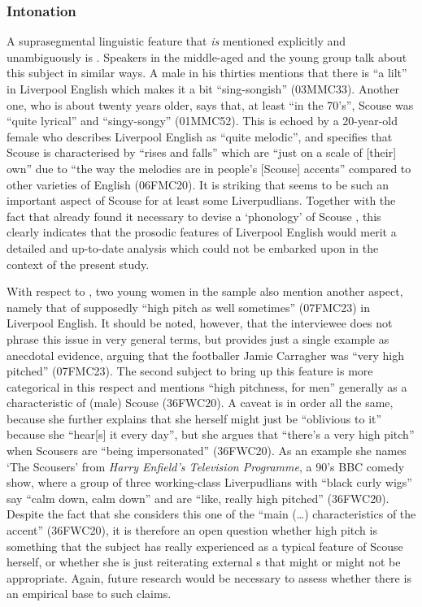 \subsubsection{Intonation}

A suprasegmental linguistic feature that \emph{is} mentioned explicitly and unambiguously is .
Speakers in the middle-aged and the young group talk about this subject in similar ways.
A male in his thirties mentions that there is ``a lilt'' in Liverpool English which makes it a bit ``sing-songish'' (03MMC33).
Another one, who is about twenty years older, says that, at least ``in the 70's'', Scouse was ``quite lyrical'' and ``singy-songy'' (01MMC52).
This is echoed by a 20-year-old female who describes Liverpool English as ``quite melodic'', and specifies that Scouse  is characterised by ``rises and falls'' which are ``just on a scale of [their] own'' due to ``the way the melodies are in people's [Scouse] accents'' compared to other varieties of English (06FMC20).
It is striking that  seems to be such an important aspect of Scouse for at least some Liverpudlians.
Together with the fact that \textcite{knowles1973} already found it necessary to devise a `phonology' of Scouse , this clearly indicates that the prosodic features of Liverpool English would merit a detailed and up-to-date analysis which could not be embarked upon in the context of the present study.

With respect to , two young women in the sample also mention another aspect, namely that of supposedly ``high pitch as well sometimes'' (07FMC23) in Liverpool English.
It should be noted, however, that the interviewee does not phrase this issue in very general terms, but provides just a single example as anecdotal evidence, arguing that the footballer Jamie Carragher was ``very high pitched'' (07FMC23).
The second subject to bring up this feature is more categorical in this respect and mentions ``high pitchness, for men'' generally as a characteristic of (male) Scouse (36FWC20).
A caveat is in order all the same, because she further explains that she herself might just be ``oblivious to it'' because she ``hear[s] it every day'', but she argues that ``there's a very high pitch'' when Scousers are ``being impersonated'' (36FWC20).
As an example she names `The Scousers' from \emph{Harry Enfield's Television Programme}, a 90's BBC comedy show, where a group of three  working-class Liverpudlians with ``black curly wigs'' say ``calm down, calm down'' and are ``like, really high pitched'' (36FWC20).
Despite the fact that she considers this one of the ``main (\ldots) characteristics of the accent'' (36FWC20), it is therefore an open question whether high pitch is something that the subject has really experienced as a typical feature of Scouse herself, or whether she is just reiterating external s that might or might not be appropriate.
Again, future research would be necessary to assess whether there is an empirical base to such claims.

